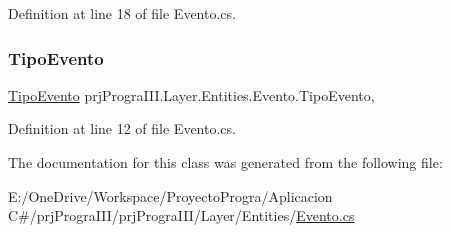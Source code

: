 Definition at line 18 of file Evento.\+cs.

\hypertarget{classprj_progra_i_i_i_1_1_layer_1_1_entities_1_1_evento_a961e8669e6bec7b661dc89930bd393bf}{}\label{classprj_progra_i_i_i_1_1_layer_1_1_entities_1_1_evento_a961e8669e6bec7b661dc89930bd393bf} 
\subsubsection{\texorpdfstring{Tipo\+Evento}{TipoEvento}}
{\footnotesize\ttfamily \hyperlink{classprj_progra_i_i_i_1_1_layer_1_1_entities_1_1_tipo_evento}{Tipo\+Evento} prj\+Progra\+I\+I\+I.\+Layer.\+Entities.\+Evento.\+Tipo\+Evento\hspace{0.3cm}{\ttfamily [get]}, {\ttfamily [set]}}



Definition at line 12 of file Evento.\+cs.



The documentation for this class was generated from the following file\+:\begin{DoxyCompactItemize}
\item 
E\+:/\+One\+Drive/\+Workspace/\+Proyecto\+Progra/\+Aplicacion C\#/prj\+Progra\+I\+I\+I/prj\+Progra\+I\+I\+I/\+Layer/\+Entities/\hyperlink{_evento_8cs}{Evento.\+cs}\end{DoxyCompactItemize}
